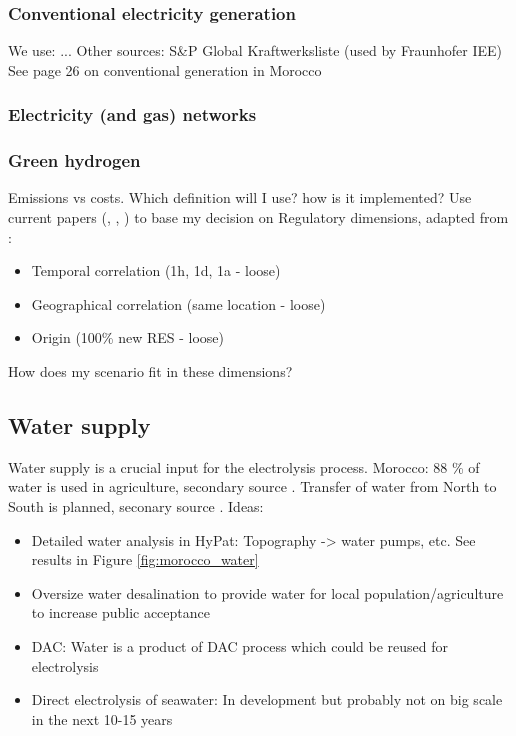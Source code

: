 \subsubsection{Conventional electricity generation}
We use: ...
Other sources: S\&P Global Kraftwerksliste (used by Fraunhofer IEE)
See \cite{Ersoy2022} page 26 on conventional generation in Morocco


\subsubsection{Electricity (and gas) networks}


\subsubsection{Green hydrogen}
Emissions vs costs. Which definition will I use? how is it implemented?
Use current papers (\cite{Brauer2022}, \cite{Ruhnau2022}, \cite{Zeyen2022a}) to base my decision on
Regulatory dimensions, adapted from \cite{Brauer2022}:
\begin{itemize}
    \item Temporal correlation (1h, 1d, 1a - loose) 
    \item Geographical correlation (same location - loose)
    \item Origin (100\% new RES - loose)
\end{itemize}
How does my scenario fit in these dimensions?

\subsection{Water supply}
\label{subsec:water_supply}
Water supply is a crucial input for the electrolysis process. 
Morocco: 88 \% of water is used in agriculture, secondary source \cite{Ersoy2022}.
Transfer of water from North to South is planned, seconary source \cite{Ersoy2022}.
Ideas:
\begin{itemize}
    \item Detailed water analysis in HyPat: Topography -> water pumps, etc. See results in Figure \ref{fig:morocco_water}
    \item Oversize water desalination to provide water for local population/agriculture to increase public acceptance
    \item DAC: Water is a product of DAC process which could be reused for electrolysis
    \item Direct electrolysis of seawater: In development but probably not on big scale in the next 10-15 years
\end{itemize}


